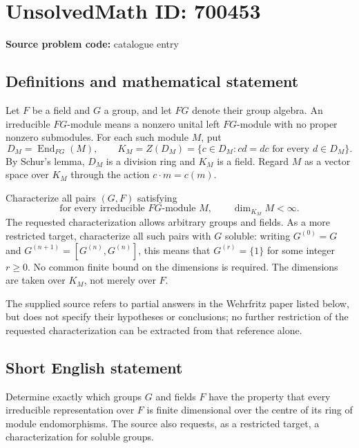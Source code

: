 \documentclass[11pt]{article}
\begin{document}
\section*{UnsolvedMath ID: 700453}
\textbf{Source problem code:} catalogue entry
\subsection{Definitions and mathematical statement}
Let \(F\) be a field and \(G\) a group, and let \(FG\) denote their group algebra. An irreducible \(FG\)-module means a nonzero unital left \(FG\)-module with no proper nonzero submodules. For each such module \(M\), put
\[
D_M=\operatorname{End}_{FG}(M),\qquad
K_M=Z(D_M)=\{c\in D_M:cd=dc\text{ for every }d\in D_M\}.
\]
By Schur's lemma, \(D_M\) is a division ring and \(K_M\) is a field. Regard \(M\) as a vector space over \(K_M\) through the action \(c\cdot m=c(m)\).

Characterize all pairs \((G,F)\) satisfying
\[
\text{for every irreducible }FG\text{-module }M,
\qquad \dim_{K_M}M<\infty.
\]
The requested characterization allows arbitrary groups and fields. As a more restricted target, characterize all such pairs with \(G\) soluble: writing \(G^{(0)}=G\) and \(G^{(n+1)}=[G^{(n)},G^{(n)}]\), this means that \(G^{(r)}=\{1\}\) for some integer \(r\geq 0\). No common finite bound on the dimensions is required. The dimensions are taken over \(K_M\), not merely over \(F\).

The supplied source refers to partial answers in the Wehrfritz paper listed below, but does not specify their hypotheses or conclusions; no further restriction of the requested characterization can be extracted from that reference alone.
\subsection{Short English statement}
Determine exactly which groups \(G\) and fields \(F\) have the property that every irreducible representation over \(F\) is finite dimensional over the centre of its ring of module endomorphisms. The source also requests, as a restricted target, a characterization for soluble groups.
\end{document}
